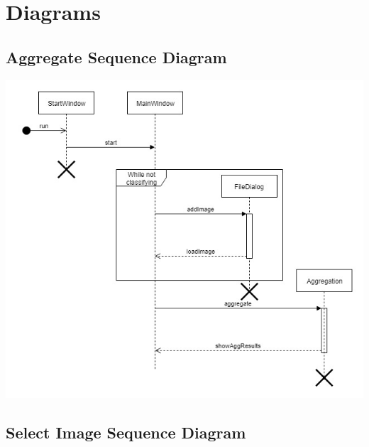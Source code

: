 \documentclass[parskip=full]{scrartcl}
\begin{document}
\pagebreak

\section {Diagrams}

\pagebreak

\subsection {Aggregate Sequence Diagram}

\begin{center}
\includegraphics[angle=90,origin=c,height=1.0\textwidth]{Aggregate.jpg}
\end{center}

\pagebreak

\subsection {Select Image Sequence Diagram}
\end{document}
